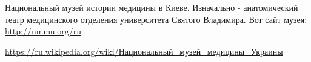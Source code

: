  
 
 
 
 

Национальный музей истории медицины в Киеве. Изначально - анатомический театр
медицинского отделения университета Святого Владимира. Вот сайт музея:
\url{http://nmmu.org/ru}


\url{https://ru.wikipedia.org/wiki/Национальный_музей_медицины_Украины}
